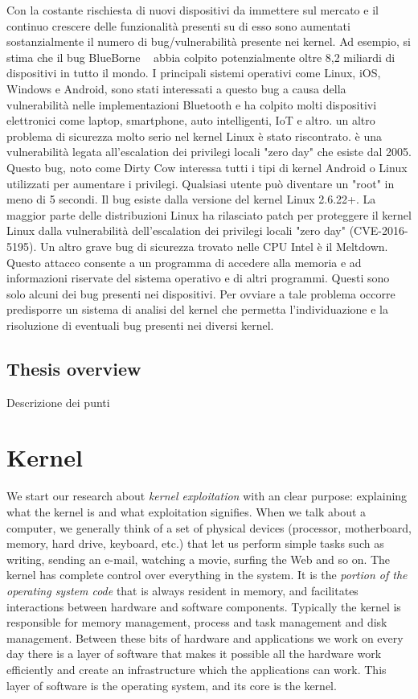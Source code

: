 \documentclass{masterthesis}
\begin{document}
Con la costante rischiesta di nuovi dispositivi da immettere sul mercato e il continuo crescere delle funzionalità presenti su di esso sono aumentati sostanzialmente il numero di bug/vulnerabilità presente nei kernel.
Ad esempio, si stima che il bug BlueBorne ~\cite{seri2019exploiting} abbia colpito potenzialmente oltre 8,2 miliardi di dispositivi in tutto il mondo. I principali sistemi operativi come Linux, iOS, Windows e Android, sono stati interessati a questo bug a causa della vulnerabilità nelle implementazioni Bluetooth e ha colpito molti dispositivi elettronici come laptop, smartphone, auto intelligenti, IoT e altro.
un altro problema di sicurezza molto serio nel kernel Linux è stato riscontrato. è una vulnerabilità legata all'escalation dei privilegi locali "zero day" che esiste dal 2005. Questo bug, noto come Dirty Cow interessa tutti i tipi di kernel Android o Linux utilizzati per aumentare i privilegi. Qualsiasi utente può diventare un "root" in meno di 5 secondi. Il bug esiste dalla versione del kernel Linux 2.6.22+. La maggior parte delle distribuzioni Linux ha rilasciato patch per proteggere il kernel Linux dalla vulnerabilità dell'escalation dei privilegi locali "zero day" (CVE-2016-5195).
Un altro grave bug di sicurezza trovato nelle CPU Intel è il Meltdown. Questo attacco consente a un programma di accedere alla memoria e ad informazioni riservate del sistema operativo e di altri programmi.
Questi sono solo alcuni dei bug presenti nei dispositivi. Per ovviare a tale problema occorre predisporre un sistema di analisi del kernel che permetta l'individuazione e la risoluzione di eventuali bug presenti nei diversi kernel.



\section{Thesis overview}Descrizione dei punti

\chapter{Kernel}
\label{ch:kernel}

We start our research about \emph{kernel exploitation} with an clear purpose: explaining what the kernel is and what exploitation signifies.
When we talk about a computer, we generally think of a set of physical devices (processor, motherboard, memory, hard drive, keyboard, etc.) that let us  perform simple tasks such as writing, sending an e-mail, watching a movie, surfing the Web and so on.
The kernel has complete control over everything in the system. It is the \emph{portion of the operating system code} that is always resident in memory, and facilitates interactions between hardware and software components.
Typically the kernel is responsible for memory management, process and task management and disk management.
Between these bits of hardware and applications we work on every day there is a layer of software that makes it possible all the hardware work efficiently and create an infrastructure which the applications can work.
This layer of software is the operating system, and its core is the kernel.
\end{document}
